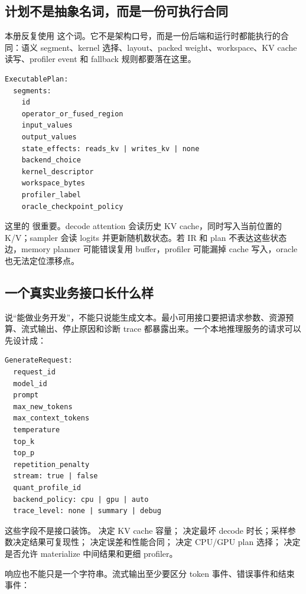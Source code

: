 \subsection{计划不是抽象名词，而是一份可执行合同}

本册反复使用  这个词。它不是架构口号，而是一份后端和运行时都能执行的合同：语义 segment、kernel 选择、layout、packed weight、workspace、KV cache 读写、profiler event 和 fallback 规则都要落在这里。

\begin{lstlisting}[numbers=none,caption={executable plan 的最小合同字段}]
ExecutablePlan:
  segments:
    id
    operator_or_fused_region
    input_values
    output_values
    state_effects: reads_kv | writes_kv | none
    backend_choice
    kernel_descriptor
    workspace_bytes
    profiler_label
    oracle_checkpoint_policy
\end{lstlisting}

这里的  很重要。decode attention 会读历史 KV cache，同时写入当前位置的 K/V；sampler 会读 logits 并更新随机数状态。若 IR 和 plan 不表达这些状态边，memory planner 可能错误复用 buffer，profiler 可能漏掉 cache 写入，oracle 也无法定位漂移点。

\subsection{一个真实业务接口长什么样}

说“能做业务开发”，不能只说能生成文本。最小可用接口要把请求参数、资源预算、流式输出、停止原因和诊断 trace 都暴露出来。一个本地推理服务的请求可以先设计成：

\begin{lstlisting}[numbers=none,caption={GenerateRequest 的最小字段}]
GenerateRequest:
  request_id
  model_id
  prompt
  max_new_tokens
  max_context_tokens
  temperature
  top_k
  top_p
  repetition_penalty
  stream: true | false
  quant_profile_id
  backend_policy: cpu | gpu | auto
  trace_level: none | summary | debug
\end{lstlisting}

这些字段不是接口装饰。  决定 KV cache 容量； 决定最坏 decode 时长；采样参数决定结果可复现性； 决定误差和性能合同； 决定 CPU/GPU plan 选择； 决定是否允许 materialize 中间结果和更细 profiler。

响应也不能只是一个字符串。流式输出至少要区分 token 事件、错误事件和结束事件：

